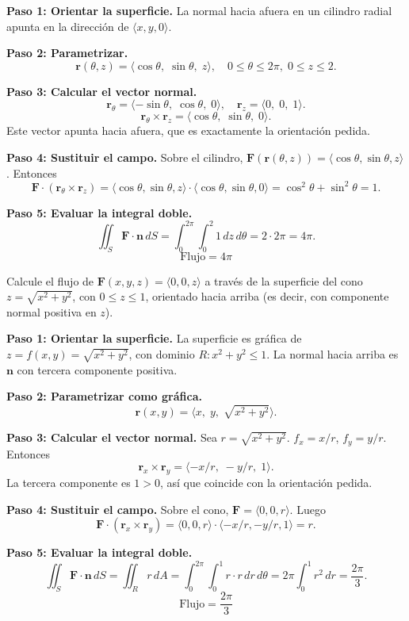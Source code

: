 \begin{myproof}
\textbf{Paso 1: Orientar la superficie.}
La normal hacia afuera en un cilindro radial apunta en la dirección de $\langle x,y,0\rangle$.

\textbf{Paso 2: Parametrizar.}
\[
\mathbf{r}(\theta,z)=\langle \cos\theta,\; \sin\theta,\; z \rangle,
\quad 0\le\theta\le 2\pi,\; 0\le z\le 2.
\]

\textbf{Paso 3: Calcular el vector normal.}
\[
\mathbf{r}_\theta = \langle -\sin\theta,\; \cos\theta,\; 0 \rangle,\quad
\mathbf{r}_z = \langle 0,\; 0,\; 1 \rangle.
\]
\[
\mathbf{r}_\theta \times \mathbf{r}_z
= \langle \cos\theta,\; \sin\theta,\; 0 \rangle.
\]
Este vector apunta hacia afuera, que es exactamente la orientación pedida.

\textbf{Paso 4: Sustituir el campo.}
Sobre el cilindro, $\mathbf{F}(\mathbf{r}(\theta,z)) = \langle \cos\theta, \sin\theta, z\rangle$. Entonces
\[
\mathbf{F}\cdot(\mathbf{r}_\theta \times \mathbf{r}_z)
= \langle \cos\theta,\sin\theta,z\rangle \cdot \langle \cos\theta,\sin\theta,0\rangle
= \cos^2\theta+\sin^2\theta = 1.
\]

\textbf{Paso 5: Evaluar la integral doble.}
\[
\iint_S \mathbf{F}\cdot\mathbf{n}\,dS
= \int_0^{2\pi}\int_0^2 1\,dz\,d\theta = 2\cdot 2\pi = 4\pi.
\]
\[
\boxed{\text{Flujo} = 4\pi}
\]
\end{myproof}

\begin{example}
Calcule el flujo de $\mathbf{F}(x,y,z)=\langle 0,0,z\rangle$ a través de la superficie del cono $z=\sqrt{x^2+y^2}$, con $0\le z\le 1$, orientado hacia arriba (es decir, con componente normal positiva en $z$).
\end{example}

\begin{myproof}
\textbf{Paso 1: Orientar la superficie.}
La superficie es gráfica de $z=f(x,y)=\sqrt{x^2+y^2}$, con dominio $R: x^2+y^2\le 1$. La normal hacia arriba es $\mathbf{n}$ con tercera componente positiva.

\textbf{Paso 2: Parametrizar como gráfica.}
\[
\mathbf{r}(x,y)=\langle x,\; y,\; \sqrt{x^2+y^2} \rangle.
\]

\textbf{Paso 3: Calcular el vector normal.}
Sea $r=\sqrt{x^2+y^2}$. $f_x = x/r$, $f_y = y/r$. Entonces
\[
\mathbf{r}_x \times \mathbf{r}_y = \langle -x/r,\; -y/r,\; 1 \rangle.
\]
La tercera componente es $1>0$, así que coincide con la orientación pedida.

\textbf{Paso 4: Sustituir el campo.}
Sobre el cono, $\mathbf{F} = \langle 0,0,r\rangle$. Luego
\[
\mathbf{F}\cdot(\mathbf{r}_x \times \mathbf{r}_y)
= \langle 0,0,r\rangle \cdot \langle -x/r,-y/r,1\rangle = r.
\]

\textbf{Paso 5: Evaluar la integral doble.}
\[
\iint_S \mathbf{F}\cdot\mathbf{n}\,dS
= \iint_R r\,dA
= \int_0^{2\pi}\int_0^1 r\cdot r\,dr\,d\theta
= 2\pi \int_0^1 r^2\,dr
= \frac{2\pi}{3}.
\]
\[
\boxed{\text{Flujo} = \frac{2\pi}{3}}
\]
\end{myproof}

